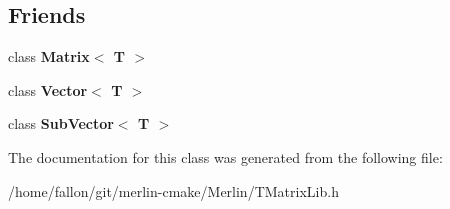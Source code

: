 \subsection*{Friends}
\begin{DoxyCompactItemize}
\item 
\mbox{\label{classTLAS_1_1ConstSubVector_a17fc06682c9f9c46f1e0e38b7af25b80}} 
class {\bfseries Matrix$<$ T $>$}
\item 
\mbox{\label{classTLAS_1_1ConstSubVector_a07857ea092bfd5d08a811e05ad544204}} 
class {\bfseries Vector$<$ T $>$}
\item 
\mbox{\label{classTLAS_1_1ConstSubVector_ae8eafab737fa8fc043dfc78dbbc714e9}} 
class {\bfseries Sub\+Vector$<$ T $>$}
\end{DoxyCompactItemize}


The documentation for this class was generated from the following file\+:\begin{DoxyCompactItemize}
\item 
/home/fallon/git/merlin-\/cmake/\+Merlin/T\+Matrix\+Lib.\+h\end{DoxyCompactItemize}

